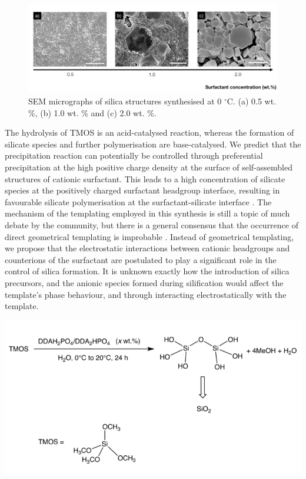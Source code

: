 \documentclass[a4paper,12pt,twocolumn]{article}
\begin{document}
  	  	\begin{figure}[t!]
  	\centering
		\includegraphics[width=\textwidth]{0deg.jpg}
 		\caption{SEM micrographs of silica structures synthesised at 0 $^\circ$C. (a) 0.5 wt. \%, (b) 1.0 wt. \% and (c) 2.0 wt. \%.}
 	\end{figure}  
  	The hydrolysis of TMOS is an acid-catalysed reaction, whereas the formation of silicate species and further polymerisation are base-catalysed. We predict that the precipitation reaction can potentially be controlled through preferential precipitation at the high positive charge density at the surface of self-assembled structures of cationic surfactant. This leads to a high concentration of silicate species at the positively charged surfactant headgroup interface, resulting in favourable silicate polymerisation at the surfactant-silicate interface \cite{monnier1993}. The mechanism of the templating employed in this synthesis is still a topic of much debate by the community, but there is a general consensus that the occurrence of direct geometrical templating is improbable \cite{colfen2007}. Instead of geometrical templating, we propose that the electrostatic interactions between cationic headgroups and counterions of the  surfactant are postulated to play a significant role in the control of silica formation. It is unknown exactly how the introduction of silica precursors, and the anionic species formed during silification would affect the template’s phase behaviour, and through interacting electrostatically with the template.
  	
  		\begin{scheme}[t!]
	 	\centering
		\includegraphics[width=1.05\columnwidth]{silicascheme.png}
  		\caption{Templated sol-gel synthesis of silica, in an aqueous solution at ambient conditions.}
  	\end{scheme}
  	
\end{document}
